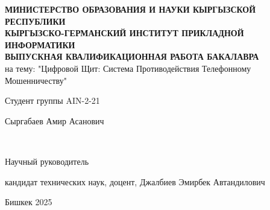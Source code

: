 
\begin{center}
\textbf{\fontsize{12}{15}\selectfont МИНИСТЕРСТВО ОБРАЗОВАНИЯ И НАУКИ КЫРГЫЗСКОЙ РЕСПУБЛИКИ} \\[0cm]
\textbf{\fontsize{12}{15}\selectfont КЫРГЫЗСКО-ГЕРМАНСКИЙ ИНСТИТУТ ПРИКЛАДНОЙ ИНФОРМАТИКИ} \\[5cm]

\textbf{ВЫПУСКНАЯ КВАЛИФИКАЦИОННАЯ РАБОТА БАКАЛАВРА} \\[0.5cm]
на тему: "Цифровой Щит: Система Противодействия Телефонному Мошенничеству" \\[5cm]

\noindent
\parbox[t]{0.33\textwidth}{\raggedright Студент группы AIN-2-21}%
\hfill
\parbox[t]{0.33\textwidth}{\centering \underline{\hspace{4cm}}}%
\hfill
\parbox[t]{0.33\textwidth}{\raggedleft Сыргабаев Амир Асанович}%
\\[1cm]

\noindent
\parbox[b]{0.33\textwidth}{\raggedright Научный руководитель}%
\hfill
\parbox[b]{0.33\textwidth}{\centering \underline{\hspace{4cm}}}%
\hfill
\parbox[b]{0.33\textwidth}{\raggedleft кандидат технических наук, доцент, Джалбиев Эмирбек Автандилович}

\vfill

\thispagestyle{empty} %

Бишкек 2025
\end{center}

\restoregeometry